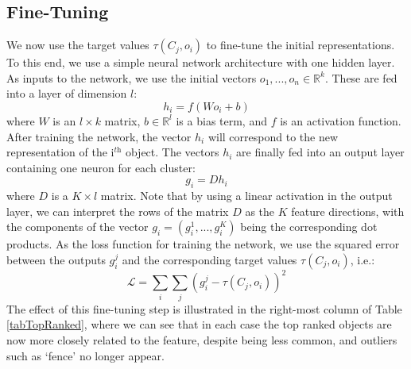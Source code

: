 \subsection{Fine-Tuning}


We now use the target values $\tau(C_j,o_i)$ to fine-tune the initial representations. To this end, we use a simple neural network architecture with one hidden layer. As inputs to the network, we use the initial vectors $o_1,...,o_n \in \mathbb{R}^k$. These are fed into a layer of dimension $l$:
$$
h_i = f(W o_i + b)
$$
where $W$ is an $l\times k$ matrix, $b\in \mathbb{R}^l$ is a bias term, and $f$ is an activation function. After training the network, the vector $h_i$ will correspond to the new representation of the i$^{\textit{th}}$ object. The vectors $h_i$ are finally fed into an output layer containing one neuron for each cluster:
$$
g_i = D h_i
$$
where $D$ is a $K \times l$ matrix. Note that by using a linear activation in the output layer, we can interpret the rows of the matrix $D$ as the $K$ feature directions, with the components of the vector $g_i = (g_i^1,...,g_i^K)$  being the corresponding dot products. %
As the loss function for training the network, we use the squared error between the outputs $g_i^j$ and the corresponding target values  $\tau(C_j,o_i)$, i.e.:
$$
\mathcal{L} = \sum_i\sum_j (g_i^j-\tau(C_j,o_i))^2
$$
The effect of this fine-tuning step is illustrated in the right-most column of Table \ref{tabTopRanked}, where we can see that in each case the top ranked objects are now more closely related to the feature, despite being less common, and outliers such as `fence' no longer appear. 

